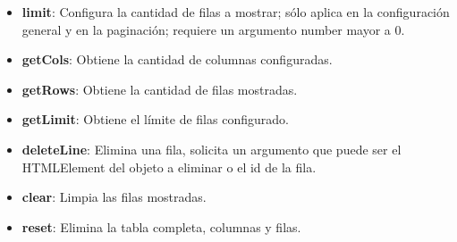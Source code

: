 \documentclass[10pt]{article}
\begin{document}
\begin{itemize}
	\item \textbf{limit}: Configura la cantidad de filas a mostrar; sólo aplica en la configuración general y en la paginación; requiere un argumento number mayor a 0.
	
	\item \textbf{getCols}: Obtiene la cantidad de columnas configuradas.
	
	\item \textbf{getRows}: Obtiene la cantidad de filas mostradas.
	
	\item \textbf{getLimit}: Obtiene el límite de filas configurado.
	
	\item \textbf{deleteLine}: Elimina una fila, solicita un argumento que puede ser el HTMLElement del objeto a eliminar o el id de la fila.
	
	\item \textbf{clear}: Limpia las filas mostradas.
	
	\item \textbf{reset}: Elimina la tabla completa, columnas y filas.
\end{itemize}
\end{document}
